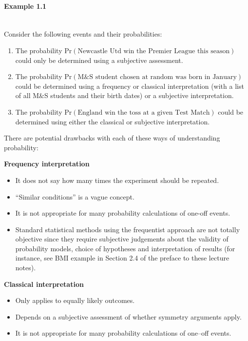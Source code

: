 \paragraph{Example 1.1}{~\\
Consider the following events and their probabilities:
\begin{enumerate}
\item The probability $\text{Pr}(\text{Newcastle Utd win the Premier League
this season})$ could only be determined using a subjective assessment.
\item The probability $\text{Pr}(\text{M&S student chosen at random was born in
January})$ could be determined using a frequency or classical
interpretation (with a list of all M&S students and their birth dates)
or a subjective interpretation.
\item The probability $\text{Pr}(\text{England win the toss at a given Test
Match})$ could be determined using either the classical or subjective
interpretation.
\end{enumerate}}

There are potential drawbacks with each of these ways of understanding
probability:

\textbf{Frequency interpretation}
\begin{itemize}
\item It does not say how many times the experiment should be repeated.
\item ``Similar conditions'' is a vague concept.
\item It is not appropriate for many probability calculations of one-off
events.
\item Standard statistical methods using the frequentist approach are
not totally objective since they require subjective judgements about
the validity of probability models, choice of hypotheses and
interpretation of results (for instance, see BMI example in Section 2.4 of the preface to these lecture notes). 
\end{itemize}

\textbf{Classical interpretation}
\begin{itemize}
\item Only applies to equally likely outcomes.
\item Depends on a subjective assessment of whether symmetry arguments
apply. 
\item It is not appropriate for many probability calculations of one--off
events.
\end{itemize}

